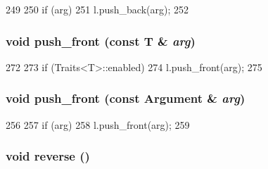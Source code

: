 \begin{DoxyCode}
249     {
250         if (arg)
251             l.push_back(arg);
252     }
\end{DoxyCode}
\hypertarget{classVarArgs_1_1List_a970400bef449e31dd2be0ba3f082d7d6}{
\subsubsection[{push\_\-front}]{\setlength{\rightskip}{0pt plus 5cm}void push\_\-front (const T \& {\em arg})}}
\label{classVarArgs_1_1List_a970400bef449e31dd2be0ba3f082d7d6}



\begin{DoxyCode}
272     {
273         if (Traits<T>::enabled)
274             l.push_front(arg);
275     }
\end{DoxyCode}
\hypertarget{classVarArgs_1_1List_a5a29145952d61c69551cc0ee406524c6}{
\subsubsection[{push\_\-front}]{\setlength{\rightskip}{0pt plus 5cm}void push\_\-front (const {\bf Argument} \& {\em arg})}}
\label{classVarArgs_1_1List_a5a29145952d61c69551cc0ee406524c6}



\begin{DoxyCode}
256     {
257         if (arg)
258             l.push_front(arg);
259     }
\end{DoxyCode}
\hypertarget{classVarArgs_1_1List_a310c0bebc002158f5646a91d60e4dc89}{
\subsubsection[{reverse}]{\setlength{\rightskip}{0pt plus 5cm}void reverse ()}}
\label{classVarArgs_1_1List_a310c0bebc002158f5646a91d60e4dc89}




